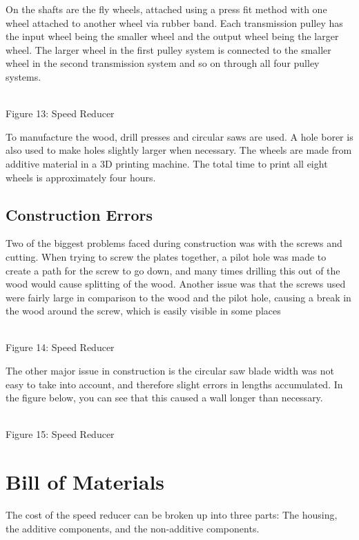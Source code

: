 \documentclass{article}
\begin{document}
On the shafts are the fly wheels, attached using a press fit method with one wheel attached to another wheel via rubber band. Each transmission pulley has the input wheel being the smaller wheel and the output wheel being the larger wheel. The larger wheel in the first pulley system is connected to the smaller wheel in the second transmission system and so on through all four pulley systems. 

\begin{center}
\\
\scriptsize{
Figure 13: Speed Reducer 
}
\end{center}

To manufacture the wood, drill presses and circular saws are used. A hole borer is also used to make holes slightly larger when necessary. The wheels are made from additive material in a 3D printing machine. The total time to print all eight wheels is approximately four hours. 
\subsection{Construction Errors}
Two of the biggest problems faced during construction was with the screws and cutting. When trying to screw the plates together, a pilot hole was made to create a path for the screw to go down, and many times drilling this out of the wood would cause splitting of the wood. Another issue was that the screws used were fairly large in comparison to the wood and the pilot hole, causing a break in the wood around the screw, which is easily visible in some places 

\begin{center}
\\
\scriptsize{
Figure 14: Speed Reducer 
}
\end{center}

The other major issue in construction is the circular saw blade width was not easy to take into account, and therefore slight errors in lengths accumulated. In the figure below, you can see that this caused a wall longer than necessary.

\begin{center}
\\
\scriptsize{
Figure 15: Speed Reducer 
}
\end{center}


\section{Bill of Materials}
The cost of the speed reducer can be broken up into three parts: The housing, the additive components, and the non-additive components.
\end{document}
